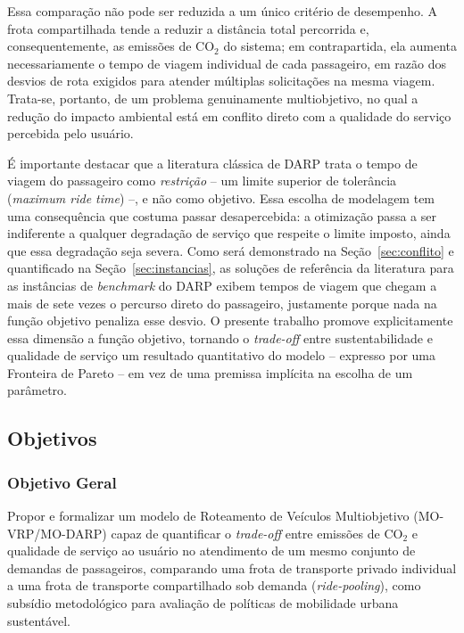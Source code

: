 \documentclass[12pt,a4paper]{article}
\theoremstyle{plain}
\begin{document}
Essa comparação não pode ser reduzida a um único critério de desempenho. A frota compartilhada tende a reduzir a distância total percorrida e, consequentemente, as emissões de $\text{CO}_2$ do sistema; em contrapartida, ela aumenta necessariamente o tempo de viagem individual de cada passageiro, em razão dos desvios de rota exigidos para atender múltiplas solicitações na mesma viagem. Trata-se, portanto, de um problema genuinamente multiobjetivo, no qual a redução do impacto ambiental está em conflito direto com a qualidade do serviço percebida pelo usuário.

É importante destacar que a literatura clássica de DARP trata o tempo de viagem do passageiro como \textit{restrição} -- um limite superior de tolerância (\textit{maximum ride time}) --, e não como objetivo. Essa escolha de modelagem tem uma consequência que costuma passar desapercebida: a otimização passa a ser indiferente a qualquer degradação de serviço que respeite o limite imposto, ainda que essa degradação seja severa. Como será demonstrado na Seção~\ref{sec:conflito} e quantificado na Seção~\ref{sec:instancias}, as soluções de referência da literatura para as instâncias de \textit{benchmark} do DARP exibem tempos de viagem que chegam a mais de sete vezes o percurso direto do passageiro, justamente porque nada na função objetivo penaliza esse desvio. O presente trabalho promove explicitamente essa dimensão a função objetivo, tornando o \textit{trade-off} entre sustentabilidade e qualidade de serviço um resultado quantitativo do modelo -- expresso por uma Fronteira de Pareto -- em vez de uma premissa implícita na escolha de um parâmetro.

\subsection{Objetivos}

\subsubsection{Objetivo Geral}

Propor e formalizar um modelo de Roteamento de Veículos Multiobjetivo (MO-VRP/\allowbreak MO-DARP) capaz de quantificar o \textit{trade-off} entre emissões de $\text{CO}_2$ e qualidade de serviço ao usuário no atendimento de um mesmo conjunto de demandas de passageiros, comparando uma frota de transporte privado individual a uma frota de transporte compartilhado sob demanda (\textit{ride-pooling}), como subsídio metodológico para avaliação de políticas de mobilidade urbana sustentável.
\end{document}
